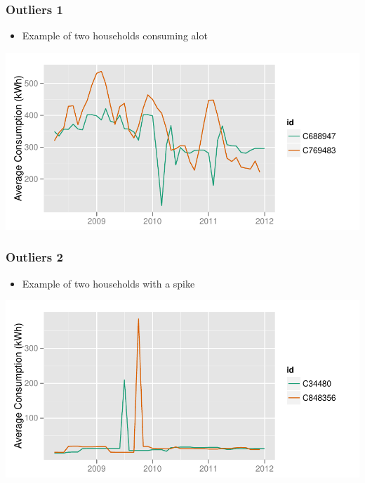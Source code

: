 \documentclass{beamer}
\begin{document}
\begin{frame}
\frametitle{Outliers 1}
\begin{itemize}
\item Example of two households consuming alot
\end{itemize}
\begin{center}
\includegraphics[width=1\textwidth]{figures/outlier1}
\end{center}
\end{frame}

\begin{frame}
\frametitle{Outliers 2}
\begin{itemize}
\item Example of two households with a spike
\end{itemize}
\begin{center}
\includegraphics[width=1\textwidth]{figures/outlier2}
\end{center}
\end{frame}
\end{document}
